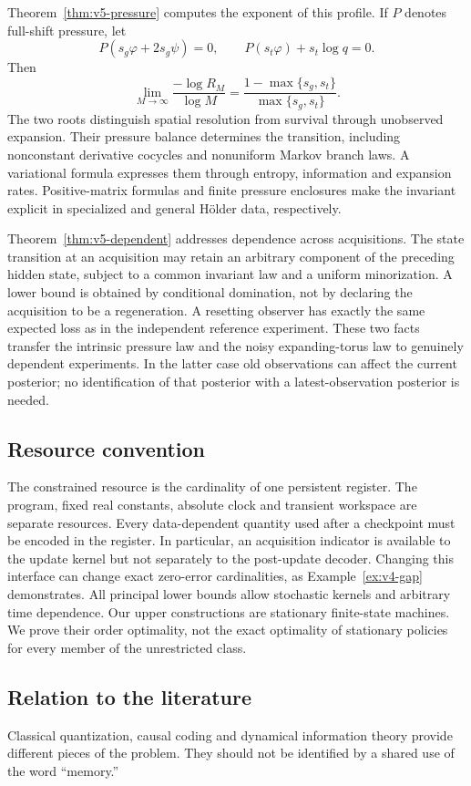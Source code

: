 Theorem~\ref{thm:v5-pressure} computes the exponent of this profile.
If $P$ denotes full-shift pressure, let
\[
 P(s_g\varphi+2s_g\psi)=0,
 \qquad P(s_t\varphi)+s_t\log q=0.
\]
Then
\[
 \lim_{M\to\infty}\frac{-\log R_M}{\log M}
 =\frac{1-\max\{s_g,s_t\}}{\max\{s_g,s_t\}}.
\]
The two roots distinguish spatial resolution from survival through
unobserved expansion. Their pressure balance determines the
transition, including nonconstant derivative cocycles and nonuniform
Markov branch laws. A variational formula expresses them through
entropy, information and expansion rates. Positive-matrix formulas
and finite pressure enclosures make the invariant explicit in
specialized and general H\"older data, respectively.

Theorem~\ref{thm:v5-dependent} addresses dependence across acquisitions.
The state transition at an acquisition may retain an arbitrary
component of the preceding hidden state, subject to a common
invariant law and a uniform minorization. A lower bound is obtained
by conditional domination, not by declaring the acquisition to be a
regeneration. A resetting observer has exactly the same expected
loss as in the independent reference experiment. These two facts
transfer the intrinsic pressure law and the noisy expanding-torus
law to genuinely dependent experiments. In the latter case old
observations can affect the current posterior; no identification of
that posterior with a latest-observation posterior is needed.

\subsection{Resource convention}
The constrained resource is the cardinality of one persistent
register. The program, fixed real constants, absolute clock and
transient workspace are separate resources. Every data-dependent
quantity used after a checkpoint must be encoded in the register.
In particular, an acquisition indicator is available to the update
kernel but not separately to the post-update decoder. Changing this
interface can change exact zero-error cardinalities, as
Example~\ref{ex:v4-gap} demonstrates. All principal lower bounds
allow stochastic kernels and arbitrary time dependence. Our upper
constructions are stationary finite-state machines. We prove their
order optimality, not the exact optimality of stationary policies
for every member of the unrestricted class.

\subsection{Relation to the literature}
Classical quantization, causal coding and dynamical information
theory provide different pieces of the problem. They should not be
identified by a shared use of the word ``memory.''

